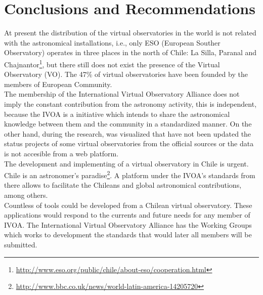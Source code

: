 \section{Conclusions and Recommendations}
At present the distribution of the virtual observatories in the world is not
related with the astronomical installations, i.e., only ESO (European Souther
Observatory) operates in three places in the north of Chile: La Silla, Paranal
and
Chajnantor\footnote{\url{http://www.eso.org/public/chile/about-eso/cooperation.html}},
but there still does not exist the presence of the Virtual Observatory (VO).
The 47\% of virtual observatories have been founded by the members of European
Community.\\

The membership of the International Virtual Observatory Alliance does not imply
the constant contribution from the astronomy activity, this is independent,
because the IVOA is a initiative which intends to share the astronomical
knowledge between them and the community in a standardized manner.  On the
other hand, during the research, was visualized that have not been updated the
status projects of some virtual observatories from the official sources or the
data is not accesible from a web platform.\\

The development and implementing of a virtual observatory in Chile is urgent.
Chile is an astronomer's
paradise\footnote{\url{http://www.bbc.co.uk/news/world-latin-america-14205720}}.
A platform under the IVOA's standards from there allows to facilitate the
Chileans and global astronomical contributions, among others.\\

Countless of tools could be developed from a Chilean virtual observatory. These
applications would respond to the currents and future needs for any member of
IVOA. The International Virtual Observatory Alliance has the Working Groups
which works to development the standards that would later all members will be
submitted.\\
